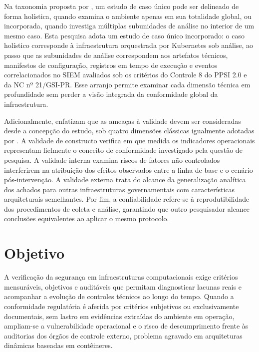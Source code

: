 Na taxonomia proposta por , um estudo de caso único pode ser delineado de forma holística, quando examina o ambiente apenas em sua totalidade global, ou incorporada, quando investiga múltiplas subunidades de análise no interior de um mesmo caso. Esta pesquisa adota um estudo de caso único incorporado: o caso holístico corresponde à infraestrutura orquestrada por Kubernetes sob análise, ao passo que as subunidades de análise correspondem aos artefatos técnicos, manifestos de configuração, registros em tempo de execução e eventos correlacionados no SIEM avaliados sob os critérios do Controle 8 do PPSI 2.0 e da NC nº 21/GSI-PR. Esse arranjo permite examinar cada dimensão técnica em profundidade sem perder a visão integrada da conformidade global da infraestrutura.

Adicionalmente,  enfatizam que as ameaças à validade devem ser consideradas desde a concepção do estudo, sob quatro dimensões clássicas igualmente adotadas por . A validade de constructo verifica em que medida os indicadores operacionais representam fielmente o conceito de conformidade investigado pela questão de pesquisa. A validade interna examina riscos de fatores não controlados interferirem na atribuição dos efeitos observados entre a linha de base e o cenário pós-intervenção. A validade externa trata do alcance da generalização analítica dos achados para outras infraestruturas governamentais com características arquiteturais semelhantes. Por fim, a confiabilidade refere-se à reprodutibilidade dos procedimentos de coleta e análise, garantindo que outro pesquisador alcance conclusões equivalentes ao aplicar o mesmo protocolo.

\section{Objetivo}
\label{sec:ec_objetivo}

A verificação da segurança em infraestruturas computacionais exige critérios mensuráveis, objetivos e auditáveis que permitam diagnosticar lacunas reais e acompanhar a evolução de controles técnicos ao longo do tempo. Quando a conformidade regulatória é aferida por critérios subjetivos ou exclusivamente documentais, sem lastro em evidências extraídas do ambiente em operação, ampliam-se a vulnerabilidade operacional e o risco de descumprimento frente às auditorias dos órgãos de controle externo, problema agravado em arquiteturas dinâmicas baseadas em contêineres.

